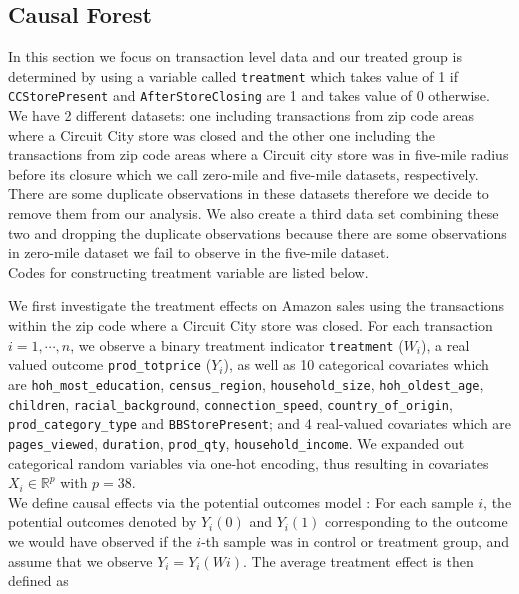 \documentclass{article}
\begin{document}
\subsection{Causal Forest}
In this section we focus on transaction level data and our treated group is determined by using a variable called \texttt{treatment} which takes value of 1 if \texttt{CCStorePresent} and \texttt{AfterStoreClosing} are 1 and takes value of 0 otherwise. We have 2 different datasets: one  including transactions from zip code areas where a Circuit City store was closed and the other one including the transactions from zip code areas where a Circuit city store was in five-mile radius before its closure which we call zero-mile and five-mile datasets, respectively. There are some duplicate observations in these datasets therefore we decide to remove them from our analysis. We also create a third data set combining these two and dropping the duplicate observations because there are some observations in zero-mile dataset we fail to observe in the five-mile dataset. \\
Codes for constructing treatment variable are listed below.

We first investigate the treatment effects on Amazon sales using the transactions within the zip code where a Circuit City store was closed. For each transaction $i=1, \cdots, n$, we observe a binary treatment indicator \texttt{treatment} ($W_i$), a real valued outcome \texttt{prod\_totprice} ($Y_i$), as well as 10 categorical covariates which are \texttt{hoh\_most\_education}, \texttt{census\_region}, \texttt{household\_size}, \texttt{hoh\_oldest\_age}, \texttt{children}, \texttt{racial\_background}, \texttt{connection\_speed}, \texttt{country\_of\_origin}, \texttt{prod\_category\_type} and \texttt{BBStorePresent}; and 4 real-valued covariates which are \texttt{pages\_viewed}, \texttt{duration}, \texttt{prod\_qty}, \texttt{household\_income}. We expanded out categorical random variables via one-hot encoding, thus resulting in covariates $X_i \in \mathbb{R}^p$  with $p = 38$. \\
We define causal effects via the potential outcomes model \cite{imbens2015causal}: For each sample $i$, the potential outcomes denoted by $Y_i(0)$ and $Y_i(1)$ corresponding to the outcome we would have observed  if the $i$-th sample was in control or treatment group, and assume that we observe $Y_i =Y_i(Wi)$.
The average treatment effect is then defined as 
\end{document}
